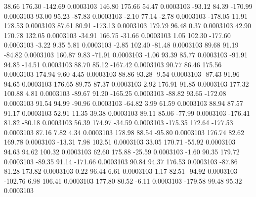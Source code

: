        38.66      176.30     -142.69     0.0003103
      146.80      175.66       54.47     0.0003103
      -93.12       84.39     -170.99     0.0003103
       93.00       95.23      -87.83     0.0003103
       -2.10       77.14       -2.78     0.0003103
     -178.05       11.91      178.53     0.0003103
       87.61       80.91     -173.13     0.0003103
      179.79       96.48        0.37     0.0003103
       42.90      170.78      132.05     0.0003103
      -34.91      166.75      -31.66     0.0003103
        1.05      102.30     -177.60     0.0003103
       -3.22        9.35        5.81     0.0003103
       -2.85      102.40      -81.48     0.0003103
       89.68       91.19      -84.82     0.0003103
      160.87        9.83      -71.91     0.0003103
       -1.06       93.39       85.77     0.0003103
      -91.91       94.85      -14.51     0.0003103
       88.70       85.12     -167.42     0.0003103
       90.77       86.46      175.56     0.0003103
      174.94        9.60        4.45     0.0003103
       88.86       93.28       -9.54     0.0003103
      -87.43       91.96       94.65     0.0003103
      176.65       89.75       87.37     0.0003103
        2.92      176.91       91.85     0.0003103
      177.32      100.88        4.81     0.0003103
      -89.67       91.20     -165.25     0.0003103
      -88.82       93.65     -172.08     0.0003103
       91.54       94.99      -90.96     0.0003103
      -64.82        3.99       61.59     0.0003103
       88.94       87.57       91.17     0.0003103
       52.91       11.35       39.38     0.0003103
       89.11       85.06      -77.99     0.0003103
     -176.41       81.82      -80.18     0.0003103
       56.39      174.97      -34.59     0.0003103
     -175.35      172.64     -177.53     0.0003103
       87.16        7.82        4.34     0.0003103
      178.98       88.54      -95.80     0.0003103
      176.74       82.62      169.78     0.0003103
      -13.31        7.98      102.51     0.0003103
       33.05      170.71      -55.92     0.0003103
       94.63       94.62      100.32     0.0003103
       62.60      175.88      -25.59     0.0003103
       -1.60       90.35      179.72     0.0003103
      -89.35       91.14     -171.66     0.0003103
       90.84       94.37      176.53     0.0003103
      -87.86       81.28      173.82     0.0003103
        0.22       96.44        6.61     0.0003103
        1.17       82.51      -94.92     0.0003103
     -102.76        6.98      106.41     0.0003103
      177.80       80.52       -6.11     0.0003103
     -179.58       99.48       95.32     0.0003103

